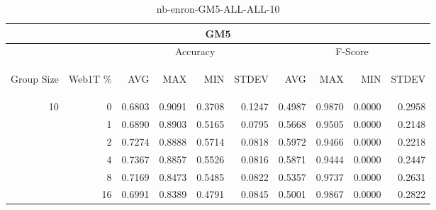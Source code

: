 \begin{center}
\begin{table}[htbp]
\begin{tabular}{ | r | r | r | r | r | r | r | r | r | r |}
\hline
\multicolumn{10}{|c|}{GM5}\\
\hline
 & & \multicolumn{4}{|c|}{Accuracy} & \multicolumn{4}{|c|}{F-Score}\\ \cline{3-10}
\begin{sideways}Group Size\end{sideways} & \begin{sideways}Web1T \%\end{sideways} & \begin{sideways}AVG\end{sideways} & \begin{sideways}MAX\end{sideways} & \begin{sideways}MIN\end{sideways} & \begin{sideways}STDEV\end{sideways} & \begin{sideways}AVG\end{sideways} & \begin{sideways}MAX\end{sideways} & \begin{sideways}MIN\end{sideways} & \begin{sideways}STDEV\end{sideways}\\
\hline
\multirow{6}{*}{10}
 & 0 & 0.6803 & 0.9091 & 0.3708 & 0.1247 & 0.4987 & 0.9870 & 0.0000 & 0.2958\\ \cline{2-10}
 & 1 & 0.6890 & 0.8903 & 0.5165 & 0.0795 & 0.5668 & 0.9505 & 0.0000 & 0.2148\\ \cline{2-10}
 & 2 & 0.7274 & 0.8888 & 0.5714 & 0.0818 & 0.5972 & 0.9466 & 0.0000 & 0.2218\\ \cline{2-10}
 & 4 & 0.7367 & 0.8857 & 0.5526 & 0.0816 & 0.5871 & 0.9444 & 0.0000 & 0.2447\\ \cline{2-10}
 & 8 & 0.7169 & 0.8473 & 0.5485 & 0.0822 & 0.5357 & 0.9737 & 0.0000 & 0.2631\\ \cline{2-10}
 & 16 & 0.6991 & 0.8389 & 0.4791 & 0.0845 & 0.5001 & 0.9867 & 0.0000 & 0.2822\\ \cline{2-10}
\hline
\end{tabular}
\caption{nb-enron-GM5-ALL-ALL-10}
\end{table}
\end{center}

